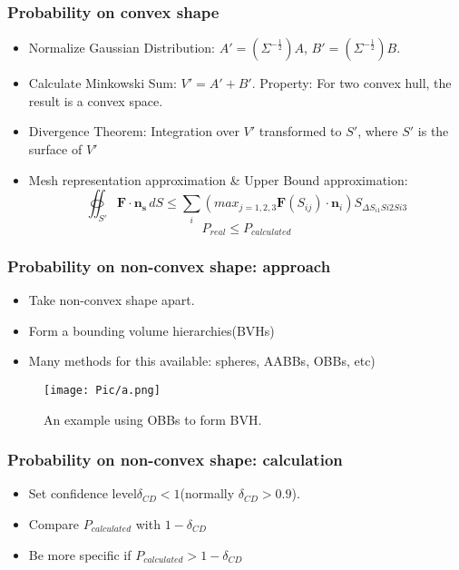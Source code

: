 \documentclass{beamer}
\begin{document}
\begin{frame}
\frametitle{Probability on convex shape}
	\begin{itemize}
	\item Normalize Gaussian Distribution: $A' = (\Sigma^{-\frac{1}{2}})A$, $B' = (\Sigma^{-\frac{1}{2}})B$. 
	\item Calculate Minkowski Sum: $V' = A' + B'$. Property: For two convex hull, the result is a convex space.
	\item Divergence Theorem: Integration over $V'$ transformed to $S'$, where $S'$ is the surface of $V'$
	\item Mesh representation approximation \& Upper Bound approximation: 
	$$\oiint_{S'}\mathbf{F}\cdot\mathbf{n_s}\,dS \leq \sum_i(max_{j = 1,2,3}\mathbf{F}(S_{ij})\cdot\mathbf{n}_i)S_{\Delta S_{i1}S{i2}S{i3}}$$
	$$P_{real} \leq P_{calculated}$$
	\end{itemize}
\end{frame}

\begin{frame}
\frametitle{Probability on non-convex shape: approach}
	\begin{itemize}
	\item Take non-convex shape apart.
	\item Form a bounding volume hierarchies(BVHs)
	\item Many methods for this available: spheres, AABBs, OBBs, etc)
	\end{itemize}
	\begin{figure}
		\texttt{[image: Pic/a.png]}
		\caption{An example using OBBs to form BVH.}
	\end{figure}
\end{frame}

\begin{frame}
\frametitle{Probability on non-convex shape: calculation}
	\begin{itemize}
	\item Set confidence level$\delta_{CD} < 1$(normally $\delta_{CD} > 0.9$).
	\item Compare $P_{calculated}$ with $1-\delta_{CD}$
	\item Be more specific if $P_{calculated} > 1-\delta_{CD}$
	\end{itemize}
\end{frame}
\end{document}
